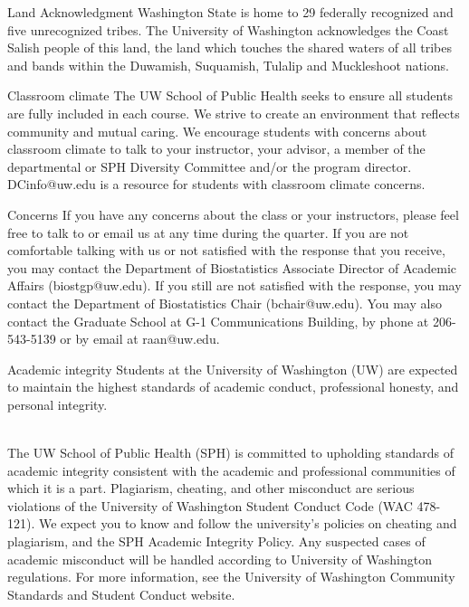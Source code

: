 \documentclass[10pt,t]{beamer}
\begin{document}
\begin{frame}{Land Acknowledgment}
Washington State is home to 29 federally recognized and five unrecognized tribes. The University of Washington acknowledges the Coast Salish people of this land, the land which touches the shared waters of all tribes and bands within the Duwamish, Suquamish, Tulalip and Muckleshoot nations.
\end{frame}

\begin{frame}{Classroom climate}
The UW School of Public Health seeks to ensure all students are fully included in each course. We strive to create an environment that reflects community and mutual caring. We encourage students with concerns about classroom climate to talk to your instructor, your advisor, a member of the departmental or SPH Diversity Committee and/or the program director. DCinfo@uw.edu is a resource for students with classroom climate concerns.
\end{frame}

\begin{frame}{Concerns}
If you have any concerns about the class or your instructors, please feel free to talk to or email us at any time during the quarter. If you are not comfortable talking with us or not satisfied with the response that you receive, you may contact the Department of Biostatistics Associate Director of Academic Affairs (biostgp@uw.edu). If you still are not satisfied with the response, you may contact the Department of Biostatistics Chair (bchair@uw.edu). You may also contact the Graduate School at G-1 Communications Building, by phone at 206-543-5139 or by email at raan@uw.edu.
\end{frame}

\begin{frame}{Academic integrity}
Students at the University of Washington (UW) are expected to maintain the highest standards of academic conduct, professional honesty, and personal integrity.
 \\~\

The UW School of Public Health (SPH) is committed to upholding standards of academic integrity consistent with the academic and professional communities of which it is a part. Plagiarism, cheating, and other misconduct are serious violations of the University of Washington Student Conduct Code (WAC 478-121). We expect you to know and follow the university’s policies on cheating and plagiarism, and the SPH Academic Integrity Policy. Any suspected cases of academic misconduct will be handled according to University of Washington regulations. For more information, see the University of Washington Community Standards and Student Conduct website.

\end{frame}
\end{document}
